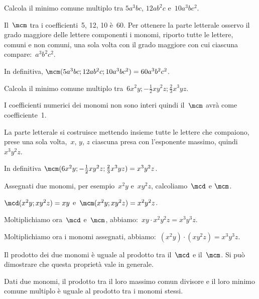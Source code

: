 \begin{exrig}
 \begin{esempio}
Calcola il minimo comune multiplo tra
$5a^{3}bc$, $12ab^{2}c$ e~$10a^{3}bc^{2}$.

Il~$\mcm$ tra i coefficienti~5, 12, 10 è~60. Per ottenere la parte
letterale osservo il grado maggiore delle lettere componenti i
monomi, riporto tutte le lettere, comuni e non comuni, una sola volta
con il grado maggiore con cui ciascuna compare:~$a^{3}b^{2}c^{2}$.

In definitiva,
$\mcm(5a^{3}bc;12ab^{2}c;10a^{3}bc^{2})=60a^{3}b^{2}c^{2}$.
 \end{esempio}

 \begin{esempio}
Calcola il minimo comune multiplo tra~$6x^{2}y;-\frac{1}{2}xy^{2}z;\frac{2}{3}x^{3}yz$.

I coefficienti numerici dei monomi non sono interi quindi il~$\mcm$
avrà come coefficiente~1.

La parte letterale si costruisce mettendo insieme tutte le lettere che
compaiono, prese una sola volta,~$x$, $y$, $z$ ciascuna presa con
l'esponente massimo, quindi~$x^{3}y^{2}z$.

In definitiva
$\mcm (6x^{2}y;-\frac{1}{2}xy^{2}z;\frac{2}{3}x^{3}yz)=x^{3}y^{2}z$.
 \end{esempio}
\end{exrig}

Assegnati due monomi, per esempio~$x^{2}y$ e~$xy^{2}z$,
calcoliamo~$\mcd$ e $\mcm$.

$\mcd (x^{2}y;xy^{2}z)=xy$ e~$\mcm (x^{2}y;xy^{2}z)=x^{2}y^{2}z$.

Moltiplichiamo ora~$\mcd$ e~$\mcm$, abbiamo:~$xy\cdot x^{2}y^{2}z= x^{3}y^{3}z.$

Moltiplichiamo ora i monomi assegnati, abbiamo:~$(x^{2}y)\cdot (xy^{2}z)=x^{3}y^{3}z.$

Il prodotto dei due monomi è uguale al prodotto tra il~$\mcd$ e
il~$\mcm$. Si può dimostrare che questa proprietà vale in generale.

\begin{proprieta}
 Dati due monomi, il prodotto tra il loro massimo comun
divisore e il loro minimo comune multiplo è uguale al prodotto tra i
monomi stessi.
\end{proprieta}


